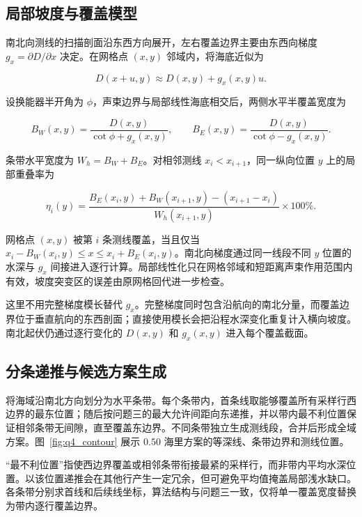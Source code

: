 \subsection{局部坡度与覆盖模型}

南北向测线的扫描剖面沿东西方向展开，左右覆盖边界主要由东西向梯度 $g_x=\partial D/\partial x$ 决定。在网格点 $(x,y)$ 邻域内，将海底近似为

\begin{equation}
  D(x+u,y)\approx D(x,y)+g_x(x,y)u.
\end{equation}

设换能器半开角为 $\phi$，声束边界与局部线性海底相交后，两侧水平半覆盖宽度为

\begin{equation}
  B_W(x,y)=\frac{D(x,y)}{\cot\phi+g_x(x,y)},\qquad
  B_E(x,y)=\frac{D(x,y)}{\cot\phi-g_x(x,y)}.
  \label{eq:q4_half}
\end{equation}

条带水平宽度为 $W_h=B_W+B_E$。对相邻测线 $x_i<x_{i+1}$，同一纵向位置 $y$ 上的局部重叠率为

\begin{equation}
  \eta_i(y)=\frac{B_E(x_i,y)+B_W(x_{i+1},y)-(x_{i+1}-x_i)}{W_h(x_{i+1},y)}\times100\%.
\end{equation}

网格点 $(x,y)$ 被第 $i$ 条测线覆盖，当且仅当
$x_i-B_W(x_i,y)\le x\le x_i+B_E(x_i,y)$。南北向梯度通过同一线段不同 $y$ 位置的水深与 $g_x$ 间接进入逐行计算。局部线性化只在网格邻域和短距离声束作用范围内有效，坡度突变区的误差由原网格回代进一步检查。

这里不用完整梯度模长替代 $g_x$。完整梯度同时包含沿航向的南北分量，而覆盖边界位于垂直航向的东西剖面；直接使用模长会把沿程水深变化重复计入横向坡度。南北起伏仍通过逐行变化的 $D(x,y)$ 和 $g_x(x,y)$ 进入每个覆盖截面。

\subsection{分条递推与候选方案生成}

将海域沿南北方向划分为水平条带。每个条带内，首条线取能够覆盖所有采样行西边界的最东位置；随后按问题三的最大允许间距向东递推，并以带内最不利位置保证相邻条带无间隙，直至覆盖东边界。不同条带独立生成测线段，合并后形成全域方案。图~\ref{fig:q4_contour} 展示 $0.50$ 海里方案的等深线、条带边界和测线位置。

“最不利位置”指使西边界覆盖或相邻条带衔接最紧的采样行，而非带内平均水深位置。以该位置递推会在其他行产生一定冗余，但可避免平均值掩盖局部浅水缺口。各条带分别求首线和后续线坐标，算法结构与问题三一致，仅将单一覆盖宽度替换为带内逐行覆盖边界。

